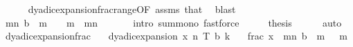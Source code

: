 \begin{isabellebody}
\ \ \ \ \isamarkupfalse%
\ dyadic{\isacharunderscore}{\kern0pt}expansion{\isacharunderscore}{\kern0pt}frac{\isacharunderscore}{\kern0pt}range{\isacharbrackleft}{\kern0pt}OF\ assms{\isacharbrackright}{\kern0pt}\ that\ \isamarkupfalse%
\ blast\isanewline
\ \ \isamarkupfalse%
\ \isamarkupfalse%
\ {\isachardoublequoteopen}{\isacharparenleft}{\kern0pt}{\isasymSum}m{\isasymin}{\isacharbraceleft}{\kern0pt}{}{\isachardot}{\kern0pt}{\isachardot}{\kern0pt}n{\isacharbraceright}{\kern0pt}{\isachardot}{\kern0pt}\ {\isacharparenleft}{\kern0pt}b\ {\isacharbang}{\kern0pt}\ {\isacharparenleft}{\kern0pt}m{\isacharminus}{\kern0pt}{}{\isacharparenright}{\kern0pt}{\isacharparenright}{\kern0pt}\ {\isacharslash}{\kern0pt}\ {}\ {\isacharcircum}{\kern0pt}\ m{\isacharparenright}{\kern0pt}\ {\isasymge}\ {\isacharparenleft}{\kern0pt}{\isasymSum}m{\isasymin}{\isacharbraceleft}{\kern0pt}{}{\isachardot}{\kern0pt}{\isachardot}{\kern0pt}n{\isacharbraceright}{\kern0pt}{\isachardot}{\kern0pt}\ {}{\isacharparenright}{\kern0pt}{\isachardoublequoteclose}\isanewline
\ \ \ \ \isamarkupfalse%
\ {\isacharparenleft}{\kern0pt}intro\ sum{\isacharunderscore}{\kern0pt}mono{\isacharcomma}{\kern0pt}\ fastforce{\isacharparenright}{\kern0pt}\isanewline
\ \ \isamarkupfalse%
\ \isamarkupfalse%
\ {\isacharquery}{\kern0pt}thesis\isanewline
\ \ \ \ \isamarkupfalse%
\ auto\isanewline
{}\isamarkupfalse%
%
\endisatagproof
{\isafoldproof}%
%
\isadelimproof
\isanewline
%
\endisadelimproof
\isanewline
{}\isamarkupfalse%
\ dyadic{\isacharunderscore}{\kern0pt}expansion{\isacharunderscore}{\kern0pt}frac{\isacharcolon}{\kern0pt}\isanewline
\ \ \ {\isachardoublequoteopen}dyadic{\isacharunderscore}{\kern0pt}expansion\ x\ n\ T\ b\ k{\isachardoublequoteclose}\isanewline
\ \ \ {\isachardoublequoteopen}frac\ x\ {\isacharequal}{\kern0pt}\ {\isacharparenleft}{\kern0pt}{\isasymSum}m{\isasymin}{\isacharbraceleft}{\kern0pt}{}{\isachardot}{\kern0pt}{\isachardot}{\kern0pt}n{\isacharbraceright}{\kern0pt}{\isachardot}{\kern0pt}\ {\isacharparenleft}{\kern0pt}b\ {\isacharbang}{\kern0pt}\ {\isacharparenleft}{\kern0pt}m{\isacharminus}{\kern0pt}{}{\isacharparenright}{\kern0pt}{\isacharparenright}{\kern0pt}{\isacharslash}{\kern0pt}\ {}\ {\isacharcircum}{\kern0pt}\ m{\isacharparenright}{\kern0pt}{\isachardoublequoteclose}\isanewline
%
\isadelimproof
\ \ %

\end{isabellebody}

